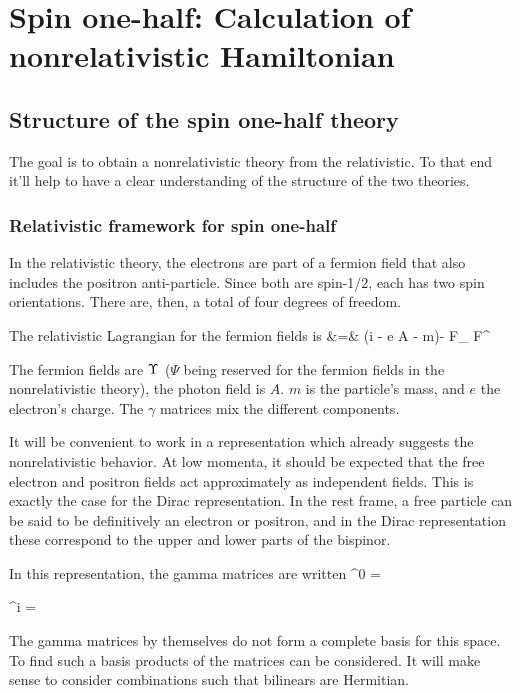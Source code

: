 
\chapter{Spin one-half: Calculation of nonrelativistic Hamiltonian}

\section{Structure of the spin one-half theory}

The goal is to obtain a nonrelativistic theory from the relativistic.  To that end it'll help to have a clear understanding of the structure of the two theories.

\subsection{Relativistic framework for spin one-half}
In the relativistic theory, the electrons are part of a fermion field that also includes the positron anti-particle.  Since both are spin-1/2, each has two spin orientations.  There are, then, a total of four degrees of freedom. 

The relativistic Lagrangian for the fermion fields is
\beqa
{} &=&	
	\Psigbar(i \partial \cdot \gamma - e A \cdot \gamma - m)\Psig  -  F_{\mu\nu} F^{\mu\nu}
\eeqa

The fermion fields are $\Upsilon$ ($\Psi$ being reserved for the fermion fields in the nonrelativistic theory), the photon field is $A$.   $m$ is the particle's mass, and $e$ the electron's charge.  The $\gamma$ matrices mix the different components.  %

It will be convenient to work in a representation which already suggests the nonrelativistic behavior.  At low momenta, it should be expected that the free electron and positron fields act approximately as independent fields.  This is exactly the case for the Dirac representation.   In the rest frame, a free particle can be said to be definitively an electron or positron, and in the Dirac representation these correspond to the upper and lower parts of the bispinor.  

In this representation, the gamma matrices are written
\beq
	\gamma^0 = 
\eeq

\beq
	\gamma^i = 
\eeq	




The gamma matrices by themselves do not form a complete basis for this space.  To find such a basis products of the matrices can be considered.  It will make sense to consider combinations such that bilinears are Hermitian.  
 

